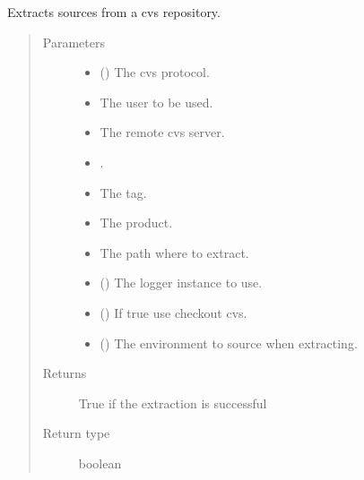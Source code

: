 \documentclass[a4paper,10pt,english]{sphinxmanual}
\begin{document}
\begin{fulllineitems}
\label{\detokenize{commands/apidoc/src:src.system.cvs_extract}}
Extracts sources from a cvs repository.
\begin{quote}\begin{description}
\item[{Parameters}] \leavevmode\begin{itemize}
\item {} 
 () \textendash{} The cvs protocol.

\item {} 
 \textendash{} The user to be used.

\item {} 
 \textendash{} The remote cvs server.

\item {} 
 \textendash{} 
.


\item {} 
 \textendash{} The tag.

\item {} 
 \textendash{} The product.

\item {} 
 \textendash{} The path where to extract.

\item {} 
 () \textendash{} The logger instance to use.

\item {} 
 () \textendash{} If true use checkout cvs.

\item {} 
 () \textendash{} The environment to source when
extracting.

\end{itemize}

\item[{Returns}] \leavevmode
True if the extraction is successful

\item[{Return type}] \leavevmode
boolean

\end{description}\end{quote}

\end{fulllineitems}
\end{document}
